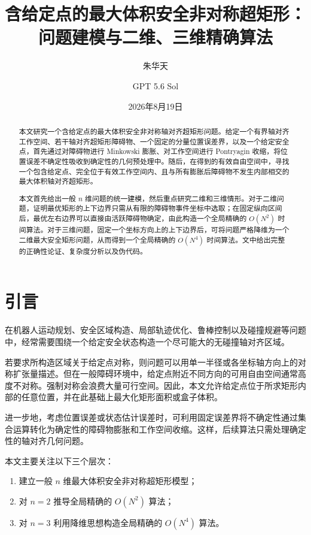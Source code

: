 \documentclass[UTF8,12pt,a4paper]{ctexart}
\title{含给定点的最大体积安全非对称超矩形：\\
问题建模与二维、三维精确算法}
\author{朱华天 \and GPT 5.6 Sol}
\date{2026年8月19日}
\begin{document}
\maketitle

\begin{abstract}
本文研究一个含给定点的最大体积安全非对称轴对齐超矩形问题。给定一个有界轴对齐工作空间、若干轴对齐超矩形障碍物、一个固定的分量位置误差界，以及一个给定安全点，首先通过对障碍物进行 Minkowski 膨胀、对工作空间进行 Pontryagin 收缩，将位置误差不确定性吸收到确定性的几何预处理中。随后，在得到的有效自由空间中，寻找一个包含给定点、完全位于有效工作空间内、且与所有膨胀后障碍物不发生内部相交的最大体积轴对齐超矩形。

本文首先给出一般 $n$ 维问题的统一建模，然后重点研究二维和三维情形。对于二维问题，证明最优矩形的上下边界只需从有限的障碍物事件坐标中选取；在固定纵向区间后，最优左右边界可以直接由活跃障碍物确定，由此构造一个全局精确的 $O(N^2)$ 时间算法。对于三维问题，固定一个坐标方向上的上下边界后，可将问题严格降维为一个二维最大安全矩形问题，从而得到一个全局精确的 $O(N^4)$ 时间算法。文中给出完整的正确性论证、复杂度分析以及伪代码。
\end{abstract}

\section{引言}

在机器人运动规划、安全区域构造、局部轨迹优化、鲁棒控制以及碰撞规避等问题中，经常需要围绕一个给定安全状态构造一个尽可能大的无碰撞轴对齐区域。

若要求所构造区域关于给定点对称，则问题可以用单一半径或各坐标轴方向上的对称扩张量描述。但在一般障碍环境中，给定点附近不同方向的可用自由空间通常高度不对称。强制对称会浪费大量可行空间。因此，本文允许给定点位于所求矩形内部的任意位置，并在此基础上最大化矩形面积或盒子体积。

进一步地，考虑位置误差或状态估计误差时，可利用固定误差界将不确定性通过集合运算转化为确定性的障碍物膨胀和工作空间收缩。这样，后续算法只需处理确定性的轴对齐几何问题。

本文主要关注以下三个层次：
\begin{enumerate}[label=(\arabic*)]
    \item 建立一般 $n$ 维最大体积安全非对称超矩形模型；
    \item 对 $n=2$ 推导全局精确的 $O(N^2)$ 算法；
    \item 对 $n=3$ 利用降维思想构造全局精确的 $O(N^4)$ 算法。
\end{enumerate}
\end{document}
